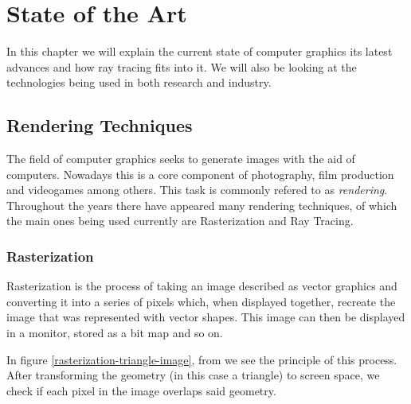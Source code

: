 \chapter{State of the Art}

In this chapter we will explain the current state of computer graphics its latest advances and how ray tracing fits into it. We will also be looking at the technologies being used in both research and industry. 

\section{Rendering Techniques}
The field of computer graphics seeks to generate images with the aid of computers. Nowadays this is a core component of photography, film production and videogames among others. This task is commonly refered to as \textit{rendering}. Throughout the years there have appeared many rendering techniques, of which the main ones being used currently are Rasterization and Ray Tracing.

\subsection{Rasterization}
Rasterization is the process of taking an image described as vector graphics and converting it into a series of pixels which, when displayed together, recreate the image that was represented with vector shapes. This image can then be displayed in a monitor, stored as a bit map and so on.

In figure \ref{rasterization-triangle-image}, from \cite{ScratchPixel} we see the principle of this process. After transforming the geometry (in this case a triangle) to screen space, we check if each pixel in the image overlaps said geometry.

